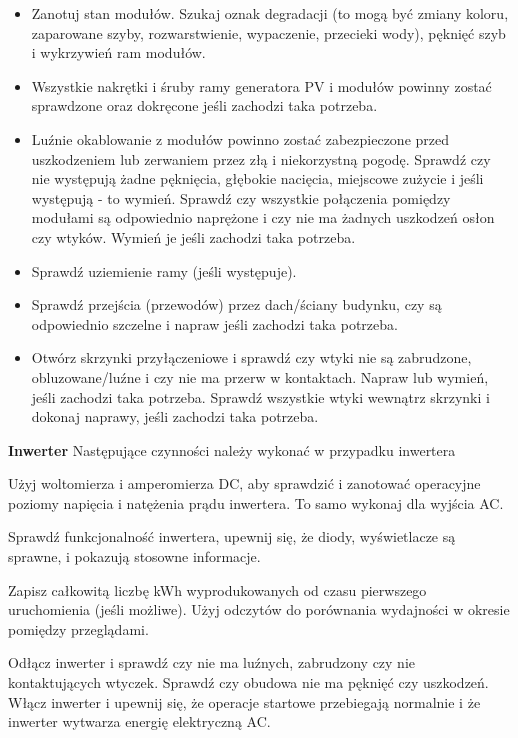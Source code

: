 \documentclass[12pt,a4paper]{article}
\begin{document}
\begin{itemize}
\item Zanotuj stan modułów. Szukaj oznak degradacji (to mogą być zmiany 
koloru, zaparowane szyby, rozwarstwienie, wypaczenie, przecieki wody), 
pęknięć szyb i wykrzywień ram modułów. 
\item Wszystkie nakrętki i śruby ramy generatora PV i modułów powinny 
zostać sprawdzone oraz dokręcone jeśli zachodzi taka potrzeba. 
\item Luźnie okablowanie z modułów powinno zostać zabezpieczone przed 
uszkodzeniem lub zerwaniem przez złą i niekorzystną pogodę. Sprawdź czy 
nie występują żadne pęknięcia, głębokie nacięcia, miejscowe zużycie i 
jeśli występują - to wymień. Sprawdź czy wszystkie połączenia pomiędzy 
modułami są odpowiednio naprężone i czy nie ma żadnych uszkodzeń osłon 
czy wtyków. Wymień je jeśli zachodzi taka potrzeba. 
\item Sprawdź uziemienie ramy (jeśli występuje). 
\item Sprawdź przejścia (przewodów) przez dach/ściany budynku, czy są 
odpowiednio szczelne i napraw jeśli zachodzi taka potrzeba. 
\item Otwórz skrzynki przyłączeniowe i sprawdź czy wtyki nie są 
zabrudzone, obluzowane/luźne i czy nie ma przerw w kontaktach. Napraw 
lub wymień, jeśli zachodzi taka potrzeba. Sprawdź wszystkie wtyki 
wewnątrz skrzynki i dokonaj naprawy, jeśli zachodzi taka potrzeba. 
\end{itemize}
 

\textbf{Inwerter}
Następujące czynności należy wykonać w przypadku inwertera 

 

Użyj woltomierza i amperomierza DC, aby sprawdzić i zanotować operacyjne 
poziomy napięcia i natężenia prądu inwertera. To samo wykonaj dla 
wyjścia AC. 

Sprawdź funkcjonalność inwertera, upewnij się, że diody, wyświetlacze są 
sprawne, i pokazują stosowne informacje. 

Zapisz całkowitą liczbę kWh wyprodukowanych od czasu pierwszego 
uruchomienia (jeśli możliwe). Użyj odczytów do porównania wydajności w 
okresie pomiędzy przeglądami. 

Odłącz inwerter i sprawdź czy nie ma luźnych, zabrudzony czy nie 
kontaktujących wtyczek. Sprawdź czy obudowa nie ma pęknięć czy 
uszkodzeń. Włącz inwerter i upewnij się, że operacje startowe 
przebiegają normalnie i że inwerter wytwarza energię elektryczną AC. 
\end{document}
